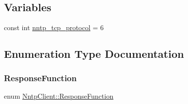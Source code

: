 \subsection*{Variables}
\begin{DoxyCompactItemize}
\item 
const int \hyperlink{namespace_nntp_client_a6a246ad62d0a9fcfe4428ecd83079e1d}{nntp\+\_\+tcp\+\_\+protocol} = 6
\end{DoxyCompactItemize}


\subsection{Enumeration Type Documentation}
\hypertarget{namespace_nntp_client_a2c87b9cd86975a1986a221b9a5885fb8}{}\label{namespace_nntp_client_a2c87b9cd86975a1986a221b9a5885fb8} 
\subsubsection{\texorpdfstring{Response\+Function}{ResponseFunction}}
{\footnotesize\ttfamily enum \hyperlink{namespace_nntp_client_a2c87b9cd86975a1986a221b9a5885fb8}{Nntp\+Client\+::\+Response\+Function}}

